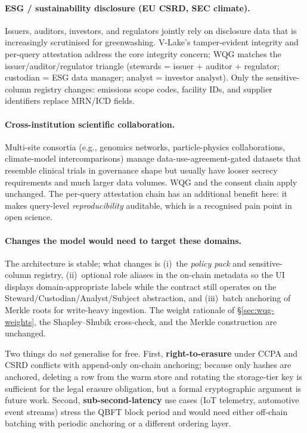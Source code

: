 \documentclass[10pt,twocolumn]{article}
\begin{document}
\paragraph{ESG / sustainability disclosure (EU CSRD, SEC climate).}
Issuers, auditors, investors, and regulators jointly rely on
disclosure data that is increasingly scrutinised for greenwashing.
V-Lake's tamper-evident integrity and per-query attestation
address the core integrity concern; WQG matches the
issuer/auditor/regulator triangle (stewards = issuer + auditor +
regulator; custodian = ESG data manager; analyst = investor
analyst). Only the sensitive-column registry changes: emissions
scope codes, facility IDs, and supplier identifiers replace
MRN/ICD fields.

\paragraph{Cross-institution scientific collaboration.}
Multi-site consortia (e.g., genomics networks, particle-physics
collaborations, climate-model intercomparisons) manage
data-use-agreement-gated datasets that resemble clinical trials in
governance shape but usually have looser secrecy requirements and
much larger data volumes. WQG and the consent chain apply
unchanged. The per-query attestation chain has an additional
benefit here: it makes query-level \emph{reproducibility}
auditable, which is a recognised pain point in open science.

\paragraph{Changes the model would need to target these domains.}
The architecture is stable; what changes is (i)~the \emph{policy
pack} and sensitive-column registry, (ii)~optional role aliases
in the on-chain metadata so the UI displays domain-appropriate
labels while the contract still operates on the
Steward/Cus\-todian/Analyst/Sub\-ject abstraction, and (iii)~batch
anchoring of Merkle roots for write-heavy ingestion. The weight
rationale of \S\ref{sec:wqg-weights}, the Shapley--Shubik
cross-check, and the Merkle construction are unchanged.

Two things do \emph{not} generalise for free.
First, \textbf{right-to-erasure} under CCPA and CSRD conflicts
with append-only on-chain anchoring; because only hashes are
anchored, deleting a row from the warm store and rotating the
storage-tier key is sufficient for the legal erasure obligation,
but a formal cryptographic argument is future work.
Second, \textbf{sub-second-latency} use cases (IoT telemetry,
automotive event streams) stress the QBFT block period and would
need either off-chain batching with periodic anchoring or a
different ordering layer.
\end{document}
